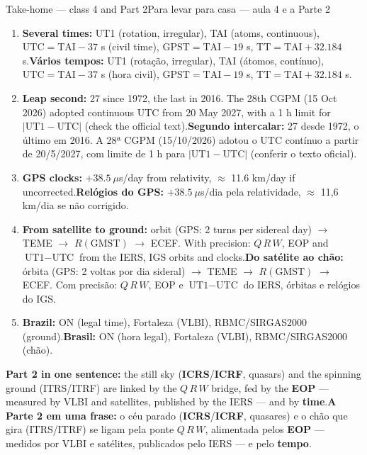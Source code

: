 \documentclass[aspectratio=169,11pt]{beamer}
\newcommand{\tr}[2]{\ifEN#2\else#1\fi}
\newcommand{\bnum}[1]{\textbf{\textcolor{mTeal}{#1}}}
\newcommand{\sist}[1]{\textcolor{corSist}{\textbf{#1}}}
\newcommand{\fram}[1]{\textcolor{corFrame}{\textbf{#1}}}
\begin{document}
\begin{frame}{\tr{Para levar para casa --- aula 4 e a Parte 2}{Take-home --- class 4 and Part 2}}
  \footnotesize
  \begin{enumerate}
    \setlength{\itemsep}{2pt}
    \item \tr{\bnum{Vários tempos:} UT1 (rotação, irregular), TAI (átomos, contínuo), $\text{UTC} = \text{TAI} - 37$ s (hora civil), $\text{GPST} = \text{TAI} - 19$ s, $\text{TT} = \text{TAI} + \num{32.184}$ s.}{\bnum{Several times:} UT1 (rotation, irregular), TAI (atoms, continuous), $\text{UTC} = \text{TAI} - 37$ s (civil time), $\text{GPST} = \text{TAI} - 19$ s, $\text{TT} = \text{TAI} + \num{32.184}$ s.}
    \item \tr{\bnum{Segundo intercalar:} 27 desde 1972, o último em 2016. A 28ª CGPM (15/10/2026) adotou o UTC contínuo a partir de 20/5/2027, com limite de 1 h para $|\text{UT1}-\text{UTC}|$ (conferir o texto oficial).}{\bnum{Leap second:} 27 since 1972, the last in 2016. The 28th CGPM (15 Oct 2026) adopted continuous UTC from 20 May 2027, with a 1 h limit for $|\text{UT1}-\text{UTC}|$ (check the official text).}
    \item \tr{\bnum{Relógios do GPS:} $+\num{38.5}\ \mu$s/dia pela relatividade, $\approx$ 11,6 km/dia se não corrigido.}{\bnum{GPS clocks:} $+\num{38.5}\ \mu$s/day from relativity, $\approx$ 11.6 km/day if uncorrected.}
    \item \tr{\bnum{Do satélite ao chão:} órbita (GPS: 2 voltas por dia sideral) $\to$ TEME $\to$ $R(\text{GMST})$ $\to$ ECEF. Com precisão: $Q\,R\,W$, EOP e $\text{UT1}-\text{UTC}$ do IERS, órbitas e relógios do IGS.}{\bnum{From satellite to ground:} orbit (GPS: 2 turns per sidereal day) $\to$ TEME $\to$ $R(\text{GMST})$ $\to$ ECEF. With precision: $Q\,R\,W$, EOP and $\text{UT1}-\text{UTC}$ from the IERS, IGS orbits and clocks.}
    \item \tr{\bnum{Brasil:} ON (hora legal), Fortaleza (VLBI), RBMC/SIRGAS2000 (chão).}{\bnum{Brazil:} ON (legal time), Fortaleza (VLBI), RBMC/SIRGAS2000 (ground).}
  \end{enumerate}
  \begin{ideia}
    \scriptsize \tr{\textbf{A Parte 2 em uma frase:} o céu parado (\sist{ICRS}/\fram{ICRF}, quasares) e o chão que gira (ITRS/ITRF) se ligam pela ponte $Q\,R\,W$, alimentada pelos \bnum{EOP} --- medidos por VLBI e satélites, publicados pelo IERS --- e pelo \bnum{tempo}.}{\textbf{Part 2 in one sentence:} the still sky (\sist{ICRS}/\fram{ICRF}, quasars) and the spinning ground (ITRS/ITRF) are linked by the $Q\,R\,W$ bridge, fed by the \bnum{EOP} --- measured by VLBI and satellites, published by the IERS --- and by \bnum{time}.}
  \end{ideia}
\end{frame}
\end{document}
